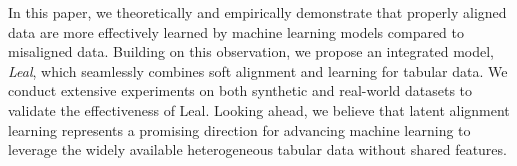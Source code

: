 In this paper, we theoretically and empirically demonstrate that properly aligned data are more effectively learned by machine learning models compared to misaligned data. Building on this observation, we propose an integrated model, \emph{Leal}, which seamlessly combines soft alignment and learning for tabular data. We conduct extensive experiments on both synthetic and real-world datasets to validate the effectiveness of Leal. Looking ahead, we believe that latent alignment learning represents a promising direction for advancing machine learning to leverage the widely available heterogeneous tabular data without shared features.
